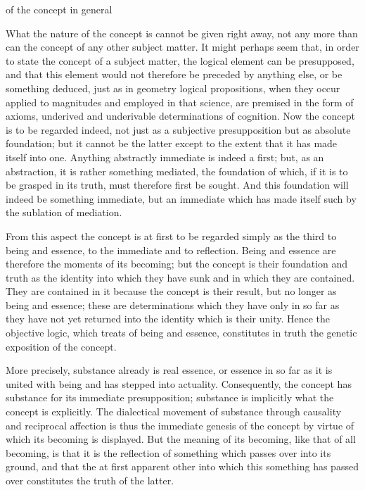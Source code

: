 
of the concept in general

What the nature of the concept is cannot be given right away,
not any more than can the concept of any other subject matter.
It might perhaps seem that, in order to state the concept of a subject matter,
the logical element can be presupposed, and that this element would not
therefore be preceded by anything else, or be something deduced,
just as in geometry logical propositions, when they occur applied to
magnitudes and employed in that science, are premised in the form of axioms,
underived and underivable determinations of cognition.
Now the concept is to be regarded indeed, not just as
a subjective presupposition but as absolute foundation;
but it cannot be the latter except to the extent that
it has made itself into one.
Anything abstractly immediate is indeed a first;
but, as an abstraction, it is rather something mediated, the foundation of which,
if it is to be grasped in its truth, must therefore first be sought.
And this foundation will indeed be something immediate,
but an immediate which has made itself such by the sublation of mediation.

From this aspect the concept is at first to be regarded simply
as the third to being and essence, to the immediate and to reflection.
Being and essence are therefore the moments of its becoming;
but the concept is their foundation and truth as the identity
into which they have sunk and in which they are contained.
They are contained in it because the concept is their result,
but no longer as being and essence;
these are determinations which they have only in so far as
they have not yet returned into the identity which is their unity.
Hence the objective logic, which treats of being and essence,
constitutes in truth the genetic exposition of the concept.

More precisely, substance already is real essence,
or essence in so far as it is united with being
and has stepped into actuality.
Consequently, the concept has substance
for its immediate presupposition;
substance is implicitly what the concept is explicitly.
The dialectical movement of substance
through causality and reciprocal affection
is thus the immediate genesis of the concept
by virtue of which its becoming is displayed.
But the meaning of its becoming,
like that of all becoming,
is that it is the reflection of something
which passes over into its ground,
and that the at first apparent other
into which this something has passed over
constitutes the truth of the latter.

